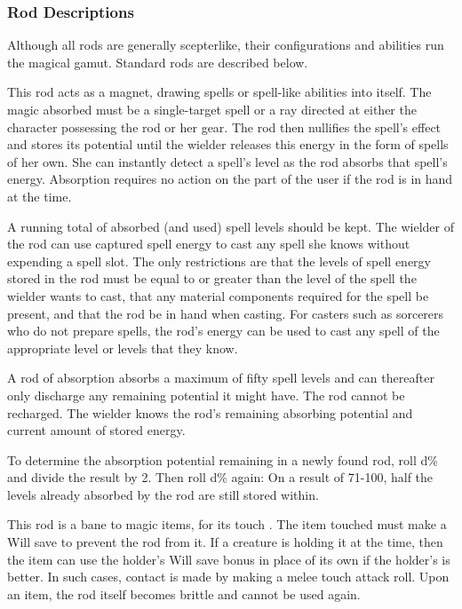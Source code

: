 \subsubsection{Rod Descriptions}

Although all rods are generally scepterlike, their configurations and abilities run the magical gamut. Standard rods are described below.

 This rod acts as a magnet, drawing spells or spell-like abilities into itself. The magic absorbed must be a single-target spell or a ray directed at either the character possessing the rod or her gear. The rod then nullifies the spell's effect and stores its potential until the wielder releases this energy in the form of spells of her own. She can instantly detect a spell's level as the rod absorbs that spell's energy. Absorption requires no action on the part of the user if the rod is in hand at the time.

A running total of absorbed (and used) spell levels should be kept. The wielder of the rod can use captured spell energy to cast any spell she knows without expending a spell slot. The only restrictions are that the levels of spell energy stored in the rod must be equal to or greater than the level of the spell the wielder wants to cast, that any material components required for the spell be present, and that the rod be in hand when casting. For casters such as sorcerers who do not prepare spells, the rod's energy can be used to cast any spell of the appropriate level or levels that they know.

A rod of absorption absorbs a maximum of fifty spell levels and can thereafter only discharge any remaining potential it might have. The rod cannot be recharged. The wielder knows the rod's remaining absorbing potential and current amount of stored energy.

To determine the absorption potential remaining in a newly found rod, roll d\% and divide the result by 2. Then roll d\% again: On a result of 71-100, half the levels already absorbed by the rod are still stored within.


 This rod is a bane to magic items, for its touch . The item touched must make a Will save to prevent the rod from  it. If a creature is holding it at the time, then the item can use the holder's Will save bonus in place of its own if the holder's is better. In such cases, contact is made by making a melee touch attack roll. Upon  an item, the rod itself becomes brittle and cannot be used again.

